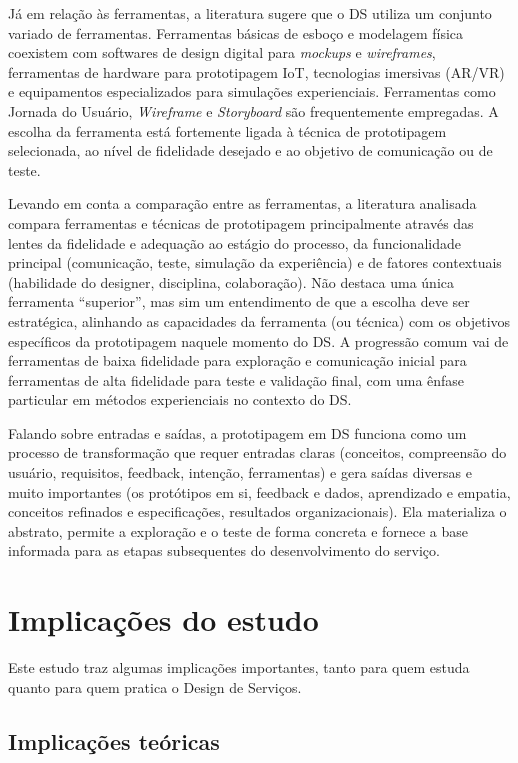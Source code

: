 Já em relação às ferramentas, a literatura sugere que o DS utiliza um conjunto variado de ferramentas. Ferramentas básicas de esboço e modelagem física coexistem com softwares de design digital para \textit{mockups} e \textit{wireframes}, ferramentas de hardware para prototipagem IoT, tecnologias imersivas (AR/VR) e equipamentos especializados para simulações experienciais. Ferramentas como Jornada do Usuário, \textit{Wireframe} e \textit{Storyboard} são frequentemente empregadas. A escolha da ferramenta está fortemente ligada à técnica de prototipagem selecionada, ao nível de fidelidade desejado e ao objetivo de comunicação ou de teste.

Levando em conta a comparação entre as ferramentas, a literatura analisada compara ferramentas e técnicas de prototipagem principalmente através das lentes da fidelidade e adequação ao estágio do processo, da funcionalidade principal (comunicação, teste, simulação da experiência) e de fatores contextuais (habilidade do designer, disciplina, colaboração). Não destaca uma única ferramenta ``superior'', mas sim um entendimento de que a escolha deve ser estratégica, alinhando as capacidades da ferramenta (ou técnica) com os objetivos específicos da prototipagem naquele momento do DS. A progressão comum vai de ferramentas de baixa fidelidade para exploração e comunicação inicial para ferramentas de alta fidelidade para teste e validação final, com uma ênfase particular em métodos experienciais no contexto do DS.

Falando sobre entradas e saídas, a prototipagem em DS funciona como um processo de transformação que requer entradas claras (conceitos, compreensão do usuário, requisitos, feedback, intenção, ferramentas) e gera saídas diversas e muito importantes (os protótipos em si, feedback e dados, aprendizado e empatia, conceitos refinados e especificações, resultados organizacionais). Ela materializa o abstrato, permite a exploração e o teste de forma concreta e fornece a base informada para as etapas subsequentes do desenvolvimento do serviço.


\section{Implicações do estudo}

Este estudo traz algumas implicações importantes, tanto para quem estuda quanto para quem pratica o Design de Serviços.


\subsection{Implicações teóricas}

